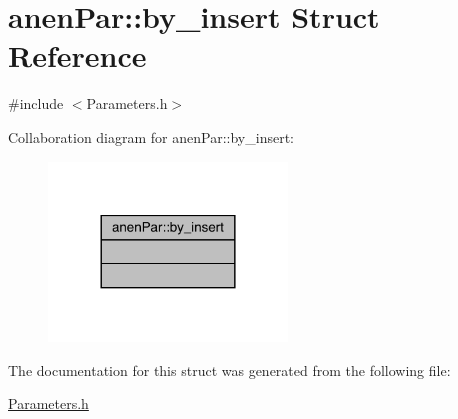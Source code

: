 \hypertarget{structanen_par_1_1by__insert}{}\section{anen\+Par\+:\+:by\+\_\+insert Struct Reference}
\label{structanen_par_1_1by__insert}


{\ttfamily \#include $<$Parameters.\+h$>$}



Collaboration diagram for anen\+Par\+:\+:by\+\_\+insert\+:\nopagebreak
\begin{figure}[H]
\begin{center}
\leavevmode
\includegraphics[width=180pt]{structanen_par_1_1by__insert__coll__graph}
\end{center}
\end{figure}


The documentation for this struct was generated from the following file\+:\begin{DoxyCompactItemize}
\item 
\mbox{\hyperlink{_parameters_8h}{Parameters.\+h}}\end{DoxyCompactItemize}
